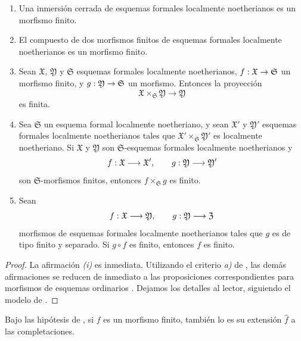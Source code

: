 \documentclass[oneside]{amsart}
\makeatletter
\newcommand{\ega@arrow}[2]{\mathchoice{#1}{#2}{#2}{#2}}
\renewcommand{\to}{\ega@arrow{\longrightarrow}{\rightarrow}}
\let\EGAOriginalLabel\label
\renewcommand{\label}[1]{\phantomsection\EGAOriginalLabel{#1}}
\makeatother
\begin{document}
\begin{proposition}[4.8.3]
\label{III.4.8.3}
\begin{enumerate}
  \item[\rm{(i)}] Una inmersión cerrada de esquemas formales localmente
    noetherianos es un morfismo finito.
  \item[\rm{(ii)}] El compuesto de dos morfismos finitos de esquemas formales
    localmente noetherianos es un morfismo finito.
  \item[\rm{(iii)}] Sean $\mathfrak{X}$, $\mathfrak{Y}$ y
    $\mathfrak{S}$ esquemas formales localmente noetherianos,
    $f:\mathfrak{X}\to\mathfrak{S}$ un morfismo finito, y
    $g:\mathfrak{Y}\to\mathfrak{S}$ un morfismo. Entonces la proyección
    \[
      \mathfrak{X}\times_{\mathfrak{S}}\mathfrak{Y}
      \longrightarrow\mathfrak{Y}
    \]
    es finita.
  \item[\rm{(iv)}] Sea $\mathfrak{S}$ un esquema formal localmente
    noetheriano, y sean $\mathfrak{X}'$ y $\mathfrak{Y}'$
    esquemas formales localmente noetherianos tales que
    $\mathfrak{X}'\times_{\mathfrak{S}}\mathfrak{Y}'$ es localmente
    noetheriano. Si $\mathfrak{X}$ y $\mathfrak{Y}$ son
    $\mathfrak{S}$-esquemas formales localmente noetherianos y
    \[
      f:\mathfrak{X}\to\mathfrak{X}',\qquad
      g:\mathfrak{Y}\to\mathfrak{Y}'
    \]
    son $\mathfrak{S}$-morfismos finitos, entonces
    $f\times_{\mathfrak{S}}g$ es finito.
  \item[\rm{(v)}] Sean
    \[
      f:\mathfrak{X}\to\mathfrak{Y},\qquad
      g:\mathfrak{Y}\to\mathfrak{Z}
    \]
    morfismos de esquemas formales localmente noetherianos tales que
    $g$ es de tipo finito y separado. Si $g\circ f$ es finito,
    entonces $f$ es finito.
\end{enumerate}
\end{proposition}

\begin{proof}
La afirmación \emph{(i)} es inmediata. Utilizando el criterio \emph{a)} de
, las demás afirmaciones se reducen de inmediato a las
proposiciones correspondientes para morfismos de esquemas ordinarios
. Dejamos los detalles al lector, siguiendo
el modelo de .
\end{proof}

\begin{corollary}[4.8.4]
\label{III.4.8.4}
Bajo las hipótesis de , si $f$ es un morfismo
finito, también lo es su extensión $\widehat{f}$ a las
completaciones.
\end{corollary}
\end{document}
